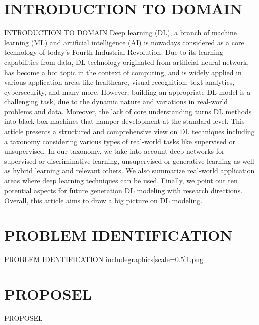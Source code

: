 \documentclass[svgnames,9pt]{beamer}
\begin{document}
\section{INTRODUCTION TO DOMAIN}
\begin{frame}{INTRODUCTION TO DOMAIN}
Deep learning (DL), a branch of machine learning (ML) and artificial intelligence (AI) is nowadays considered as a core technology of today’s Fourth Industrial Revolution. Due to its learning capabilities from data, DL technology originated from artificial neural network, has become a hot topic in the context of computing, and is widely applied in various application areas like healthcare, visual recognition, text analytics, cybersecurity, and many more. However, building an appropriate DL model is a challenging task, due to the dynamic nature and variations in real-world problems and data. Moreover, the lack of core understanding turns DL methods into black-box machines that hamper development at the standard level. This article presents a structured and comprehensive view on DL techniques including a taxonomy considering various types of real-world tasks like supervised or unsupervised. In our taxonomy, we take into account deep networks for supervised or discriminative learning, unsupervised or generative learning as well as hybrid learning and relevant others. We also summarize real-world application areas where deep learning techniques can be used. Finally, we point out ten potential aspects for future generation DL modeling with research directions. Overall, this article aims to draw a big picture on DL modeling.
\end{frame}

\section{PROBLEM IDENTIFICATION}
\begin{frame}{PROBLEM IDENTIFICATION}
includegraphics[scale=0.5]{1.png}
\end{frame}
\section{PROPOSEL}
\begin{frame}{PROPOSEL}
\end{frame}
\end{document}
